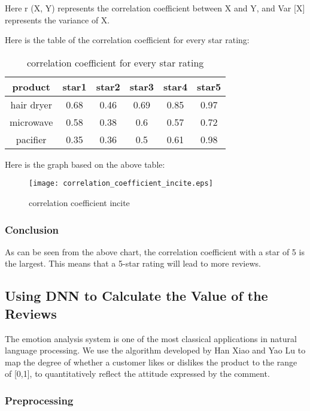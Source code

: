 \documentclass{mcmthesis}
\begin{document}
	Here r (X, Y) represents the correlation coefficient between X and Y, and Var [X] represents the variance of X.
	
	Here is the table of the correlation coefficient for every star rating:
	
	\begin{table}[H]
		\centering
		\caption{correlation coefficient for every star rating}
		\resizebox{120mm}{15mm}
		{%
			\begin{tabular}{|c|c|c|c|c|c|}
				\hline
				product    & star1 & star2 & star3 & star4 & star5 \\ \hline
				hair dryer & 0.68  & 0.46  & 0.69  & 0.85  & 0.97  \\ \hline
				microwave  & 0.58  & 0.38  & 0.6   & 0.57  & 0.72  \\ \hline
				pacifier   & 0.35  & 0.36  & 0.5   & 0.61  & 0.98  \\ \hline
			\end{tabular}%
		}
	\end{table}
	
	Here is the graph based on the above table:
	
	\begin{figure}[H]
		\small
		\centering
		\texttt{[image: correlation\_coefficient\_incite.eps]}
		\caption{correlation coefficient incite} \label{fig:correlation coefficient incite}
	\end{figure}
	
	\subsubsection{Conclusion}
	
	As can be seen from the above chart, the correlation coefficient with a star of 5 is the largest. This means that a 5-star rating will lead to more reviews.
	
	\subsection{Using DNN to Calculate the Value of the Reviews}
	The emotion analysis system is one of the most classical applications in natural language processing. We use the algorithm developed by Han Xiao and Yao Lu\cite{1} to map the degree of whether a customer likes or dislikes the product to the range of [0,1], to quantitatively reflect the attitude expressed by the comment.
	\subsubsection{Preprocessing}
	
\end{document}
